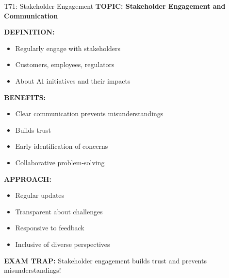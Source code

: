 \documentclass[8pt]{beamer}
\begin{document}
	\begin{frame}{T71: Stakeholder Engagement}
		\fontsize{6.5}{7.5}\selectfont
		\textbf{TOPIC: Stakeholder Engagement and Communication}
		
		\vspace{0.1cm}
		\textbf{DEFINITION:}
		\begin{itemize}
			\item Regularly engage with stakeholders
			\item Customers, employees, regulators
			\item About AI initiatives and their impacts
		\end{itemize}
		
		\vspace{0.1cm}
		\textbf{BENEFITS:}
		\begin{itemize}
			\item Clear communication prevents misunderstandings
			\item Builds trust
			\item Early identification of concerns
			\item Collaborative problem-solving
		\end{itemize}
		
		\vspace{0.1cm}
		\textbf{APPROACH:}
		\begin{itemize}
			\item Regular updates
			\item Transparent about challenges
			\item Responsive to feedback
			\item Inclusive of diverse perspectives
		\end{itemize}
		
		\textcolor{myred}{\textbf{EXAM TRAP:}} Stakeholder engagement \textcolor{myblue}{builds trust and prevents misunderstandings}!
	\end{frame}
	
\end{document}
